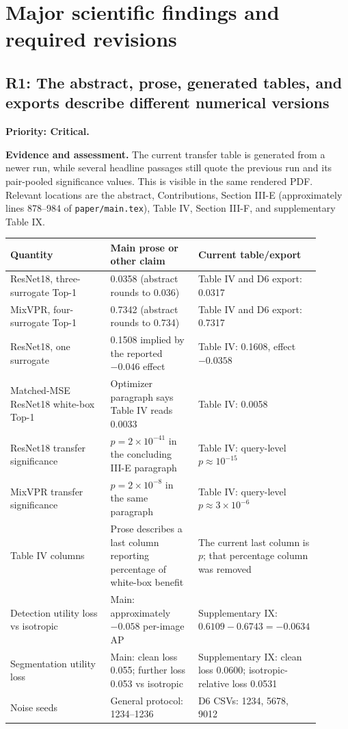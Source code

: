 \documentclass[11pt,a4paper]{article}
\newcommand{\finding}[3]{\subsection{#1: #3}\label{rev:#1}\textbf{Priority: #2.}}
\newcommand{\file}[1]{\nolinkurl{#1}}
\newcommand{\evidence}{\par\textbf{Evidence and assessment.} }
\begin{document}
\section{Major scientific findings and required revisions}

\finding{R1}{Critical}{The abstract, prose, generated tables, and exports describe different numerical versions}
\evidence
The current transfer table is generated from a newer run, while several headline passages still quote the previous run and its pair-pooled significance values. This is visible in the same rendered PDF. Relevant locations are the abstract, Contributions, Section III-E (approximately lines 878--984 of \file{paper/main.tex}), Table IV, Section III-F, and supplementary Table IX.

\begin{longtable}{L{0.32\linewidth}L{0.29\linewidth}L{0.29\linewidth}}
\toprule
Quantity & Main prose or other claim & Current table/export \\
\midrule
\endhead
ResNet18, three-surrogate Top-1 & 0.0358 (abstract rounds to 0.036) & Table IV and D6 export: 0.0317 \\
MixVPR, four-surrogate Top-1 & 0.7342 (abstract rounds to 0.734) & Table IV and D6 export: 0.7317 \\
ResNet18, one surrogate & 0.1508 implied by the reported $-0.046$ effect & Table IV: 0.1608, effect $-0.0358$ \\
Matched-MSE ResNet18 white-box Top-1 & Optimizer paragraph says Table IV reads 0.0033 & Table IV: 0.0058 \\
ResNet18 transfer significance & $p=2\times10^{-41}$ in the concluding III-E paragraph & Table IV: query-level $p\approx10^{-15}$ \\
MixVPR transfer significance & $p=2\times10^{-8}$ in the same paragraph & Table IV: query-level $p\approx3\times10^{-6}$ \\
Table IV columns & Prose describes a last column reporting percentage of white-box benefit & The current last column is $p$; that percentage column was removed \\
Detection utility loss vs isotropic & Main: approximately $-0.058$ per-image AP & Supplementary IX: $0.6109-0.6743=-0.0634$ \\
Segmentation utility loss & Main: clean loss 0.055; further loss 0.053 vs isotropic & Supplementary IX: clean loss 0.0600; isotropic-relative loss 0.0531 \\
Noise seeds & General protocol: 1234--1236 & D6 CSVs: 1234, 5678, 9012 \\
\bottomrule
\end{longtable}
\end{document}
